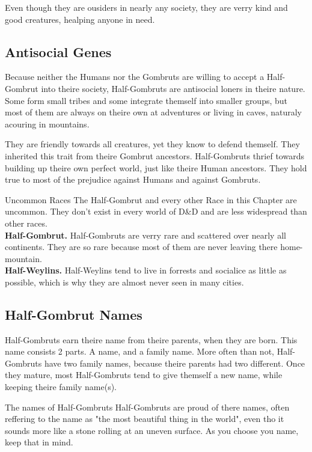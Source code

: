 \documentclass[10pt,twoside,twocolumn,openany]{book}
\begin{document}
Even though they are ousiders in nearly any society, they are verry kind and good creatures, healping anyone in need.

\subsection{Antisocial Genes}
Because neither the Humans nor the Gombruts are willing to accept a Half-Gombrut into theire society, Half-Gombruts are antisocial loners in theire nature. Some form small tribes and some integrate themself into smaller groups, but most of them are always on theire own at adventures or living in caves, naturaly acouring in mountains.

They are friendly towards all creatures, yet they know to defend themself. They inherited this trait from theire Gombrut ancestors. Half-Gombruts thrief towards building up theire own perfect world, just like theire Human ancestors. They hold true to most of the prejudice against Humans and against Gombruts. 

\newpage
\begin{commentbox}{Uncommon Races}
The Half-Gombrut and every other Race in this Chapter are uncommon. They don't exist in every world of D\&D and are less widespread than other races.\\
\textbf{Half-Gombrut.} Half-Gombruts are verry rare and scattered over nearly all continents. They are so rare because most of them are never leaving there home-mountain.\\
\textbf{Half-Weylins.} Half-Weylins tend to live in forrests and socialice as little as possible, which is why they are almost never seen in many cities.\\
\end{commentbox}

\subsection{Half-Gombrut Names}
Half-Gombruts earn theire name from theire parents, when they are born. This name consists 2 parts. A name, and a family name. More often than not, Half-Gombruts have two family names, because theire parents had two different. Once they mature, most Half-Gombruts tend to give themself a new name, while keeping theire family name(s).

\begin{paperbox}{The names of Half-Gombruts}
Half-Gombruts are proud of there names, often reffering to the name as "the most beautiful thing in the world", even tho it sounds more like a stone rolling at an uneven surface. As you choose you name, keep that in mind.
\end{paperbox}
\end{document}
